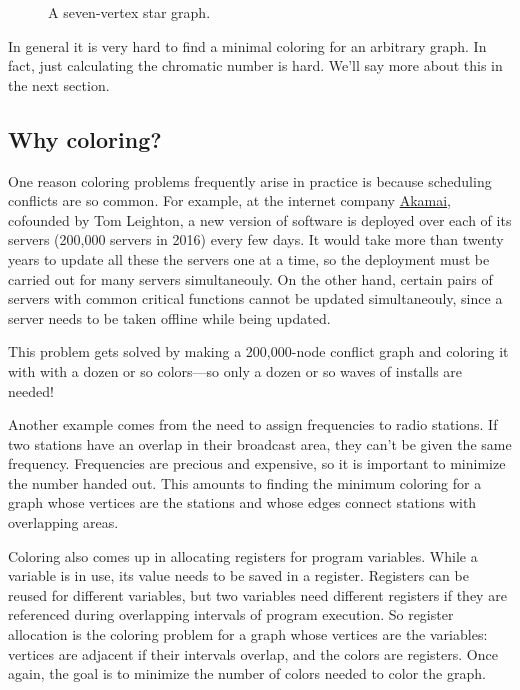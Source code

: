 \begin{figure}
\caption{A seven-vertex star graph.}
\label{fig:5T}
\end{figure}

In general it is very hard to find a minimal coloring for an arbitrary
graph.  In fact, just calculating the chromatic number is hard.  We'll
say more about this in the next section.

\subsection{Why coloring?}

One reason coloring problems frequently arise in practice is because
scheduling conflicts are so common.  For example, at the internet
company \href{www.akamai.com}{Akamai}, cofounded by Tom Leighton, a
new version of software is deployed over each of its servers (200,000
servers in 2016) every few days.  It would take more than twenty years
to update all these the servers one at a time, so the deployment must
be carried out for many servers simultaneouly.  On the other hand,
certain pairs of servers with common critical functions cannot be
updated simultaneouly, since a server needs to be taken offline while
being updated.

This problem gets solved by making a 200,000-node conflict graph and
coloring it with with a dozen or so colors---so only a dozen or so
waves of installs are needed!

Another example comes from the need to assign frequencies to radio
stations.  If two stations have an overlap in their broadcast area,
they can't be given the same frequency.  Frequencies are precious and
expensive, so it is important to minimize the number handed out.  This
amounts to finding the minimum coloring for a graph whose vertices are
the stations and whose edges connect stations with overlapping areas.

Coloring also comes up in allocating registers for program variables.
While a variable is in use, its value needs to be saved in a register.
Registers can be reused for different variables, but two variables
need different registers if they are referenced during overlapping
intervals of program execution.  So register allocation is the
coloring problem for a graph whose vertices are the variables:
vertices are adjacent if their intervals overlap, and the colors are
registers.  Once again, the goal is to minimize the number of colors
needed to color the graph.

